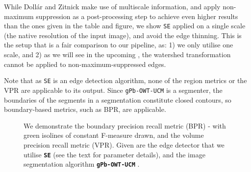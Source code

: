 While Doll{\'a}r and Zitnick \cite{DollarICCV13edges} make use of multiscale information, and apply non-maximum suppression as a post-processing step to achieve even higher results %
than the ones given in the table and figure,
we show {\tt SE} applied on a single scale (the native resolution of the input image), and avoid the edge thinning. This is the setup that is a fair comparison to our pipeline, as: 1) we only utilise one scale, and 2) as we will see in the upcoming , 
the watershed transformation cannot be applied to non-maximum-suppressed edges.

Note that as {\tt SE} is an edge detection algorithm, none of the region metrics or the VPR are applicable to its output. Since {\tt gPb-OWT-UCM} is a segmenter, the boundaries of the segments in a segmentation constitute closed contours, so boundary-based metrics, such as BPR, are applicable.

\begin{figure}[t]
\centering
\caption[{\tt SE} and {\tt gPb-OWT-UCM} comparison - plots]{We demonstrate the boundary precision recall metric (BPR) - with %
green isolines of constant F-measure drawn, and the volume precision recall metric (VPR). Given are the edge detector that we utilise \textbf{\texttt{SE}} \cite{DollarICCV13edges} (see the text for parameter details), and the image segmentation algorithm \textbf{\texttt{gPb-OWT-UCM}} \cite{Arbelaez11}.}
\label{fig:SE_vs_gPb_OWT_UCM}
\end{figure}

